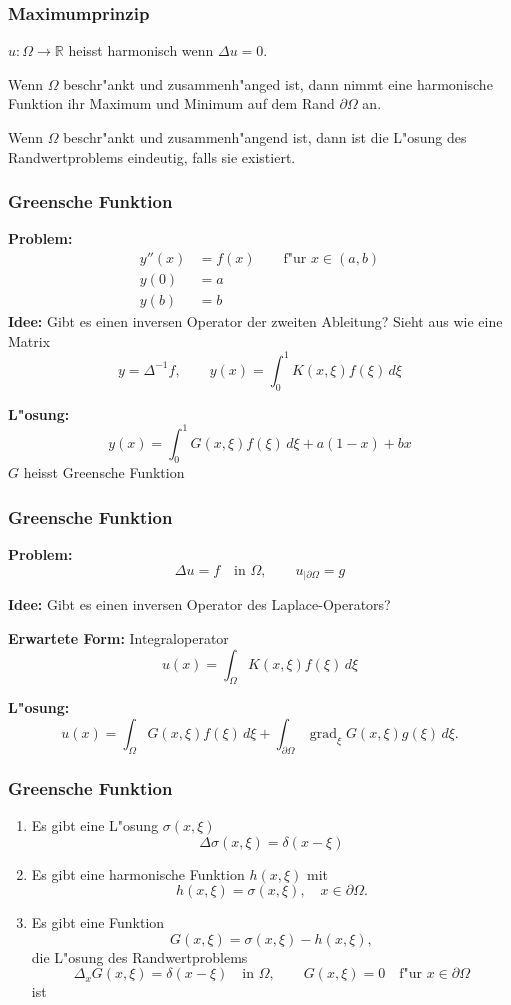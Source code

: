 \documentclass{beamer}
\begin{document}
\begin{frame}
\frametitle{Maximumprinzip}
\begin{definition}
$u\colon\Omega\to\mathbb R$ heisst harmonisch wenn $\Delta u=0$.
\end{definition}

\pause

\begin{theorem}
Wenn $\Omega$ beschr"ankt und zusammenh"anged ist, dann nimmt eine
harmonische Funktion ihr Maximum und Minimum auf dem Rand $\partial\Omega$ an.
\end{theorem}

\pause

\begin{theorem}
Wenn $\Omega$ beschr"ankt und zusammenh"angend ist, dann ist die 
L"osung des Randwertproblems eindeutig, falls sie existiert.
\end{theorem}

\end{frame}

\begin{frame}
\frametitle{Greensche Funktion}
{\bf Problem:}
\begin{align*}
y''(x)&=f(x) \qquad\text{f"ur $x \in (a,b)$}\\
y(0)&=a\\
y(b)&=b
\end{align*}
{\bf Idee:} Gibt es einen inversen Operator der zweiten Ableitung?
\pause
Sieht aus wie eine Matrix
\[
y = \Delta^{-1}f,
\qquad
y(x)=\int_0^1 K(x,\xi)f(\xi)\,d\xi
\]

{\bf L"osung:}
\[
y(x)=\int_0^1 G(x,\xi)f(\xi)\,d\xi + a(1-x) + bx
\]
$G$ heisst Greensche Funktion
\end{frame}

\begin{frame}
\frametitle{Greensche Funktion}
{\bf Problem:}
\[
\Delta u=f\quad\text{in $\Omega$},\qquad u_{|\partial\Omega}=g
\]
\bigskip

{\bf Idee:} Gibt es einen inversen Operator des Laplace-Operators?
\bigskip

{\bf Erwartete Form:} Integraloperator
\[
u(x)=\int_\Omega K(x,\xi)f(\xi)\,d\xi
\]
\bigskip

{\bf L"osung:}
\[
u(x)
=
\int_{\Omega} G(x,\xi)f(\xi)\,d\xi
+
\int_{\partial\Omega}  \operatorname{grad}_\xi G(x,\xi) g(\xi)\,d\xi.
\]

\end{frame}

\begin{frame}
\frametitle{Greensche Funktion}

\begin{enumerate}
\item
Es gibt eine L"osung $\sigma(x,\xi)$
\[
\Delta \sigma (x,\xi)=\delta(x-\xi)
\]
\item 
Es gibt eine harmonische Funktion $h(x,\xi)$ mit
\[
h(x,\xi)=\sigma(x,\xi),\quad x\in\partial\Omega.
\]
\item
Es gibt eine Funktion
\[
G(x,\xi) = \sigma(x,\xi)-h(x,\xi),
\]
die L"osung des Randwertproblems
\[
\Delta_x G(x,\xi) = \delta(x-\xi)\quad\text{in $\Omega$},
\qquad
G(x,\xi)=0\quad\text{f"ur $x\in\partial\Omega$}
\]
ist
\end{enumerate}
\end{frame}
\end{document}
